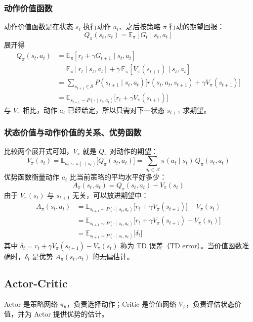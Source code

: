 \documentclass[UTF8,fontset=fandol]{ctexart}
\begin{document}
\subsubsection{动作价值函数}

动作价值函数是在状态 $s_t$ 执行动作 $a_t$、之后按策略 $\pi$ 行动的期望回报：
\[
Q_\pi(s_t,a_t)=\mathbb{E}_\pi\left[G_t\mid s_t,a_t\right]
\]
展开得
\begin{align*}
Q_\pi(s_t,a_t)
&=\mathbb{E}_\pi\left[r_t+\gamma G_{t+1}\mid s_t,a_t\right]\\
&=\mathbb{E}_\pi\left[r_t\mid s_t,a_t\right]+\gamma\,\mathbb{E}_\pi\left[V_\pi(s_{t+1})\mid s_t,a_t\right]\\
&=\sum_{s_{t+1}\in\mathcal{S}}P(s_{t+1}\mid s_t,a_t)\big[r(s_t,a_t,s_{t+1})+\gamma V_\pi(s_{t+1})\big]\\
&=\mathbb{E}_{s_{t+1}\sim P(\cdot\mid s_t,a_t)}\big[r_t+\gamma V_\pi(s_{t+1})\big]
\end{align*}
与 $V_\pi$ 相比，动作 $a_t$ 已经给定，所以只需对下一状态 $s_{t+1}$ 求期望。

\subsubsection{状态价值与动作价值的关系、优势函数}

比较两个展开式可知，$V_\pi$ 就是 $Q_\pi$ 对动作的期望：
\[
V_\pi(s_t)=\mathbb{E}_{a_t\sim\pi(\cdot\mid s_t)}\big[Q_\pi(s_t,a_t)\big]=\sum_{a_t\in\mathcal{A}}\pi(a_t\mid s_t)\,Q_\pi(s_t,a_t)
\]
优势函数衡量动作 $a_t$ 比当前策略的平均水平好多少：
\[
A_\pi(s_t,a_t)=Q_\pi(s_t,a_t)-V_\pi(s_t)
\]
由于 $V_\pi(s_t)$ 与 $s_{t+1}$ 无关，可以放进期望中：
\begin{align*}
A_\pi(s_t,a_t)
&=\mathbb{E}_{s_{t+1}\sim P(\cdot\mid s_t,a_t)}\big[r_t+\gamma V_\pi(s_{t+1})\big]-V_\pi(s_t)\\
&=\mathbb{E}_{s_{t+1}\sim P(\cdot\mid s_t,a_t)}\big[r_t+\gamma V_\pi(s_{t+1})-V_\pi(s_t)\big]\\
&=\mathbb{E}_{s_{t+1}\sim P(\cdot\mid s_t,a_t)}\big[\delta_t\big]
\end{align*}
其中 $\delta_t=r_t+\gamma V_\pi(s_{t+1})-V_\pi(s_t)$ 称为 TD 误差（TD error）。当价值函数准确时，$\delta_t$ 是优势 $A_\pi(s_t,a_t)$ 的无偏估计。

\subsection{Actor-Critic}

Actor 是策略网络 $\pi_\theta$，负责选择动作；Critic 是价值网络 $V_\phi$，负责评估状态价值，并为 Actor 提供优势的估计。
\end{document}
